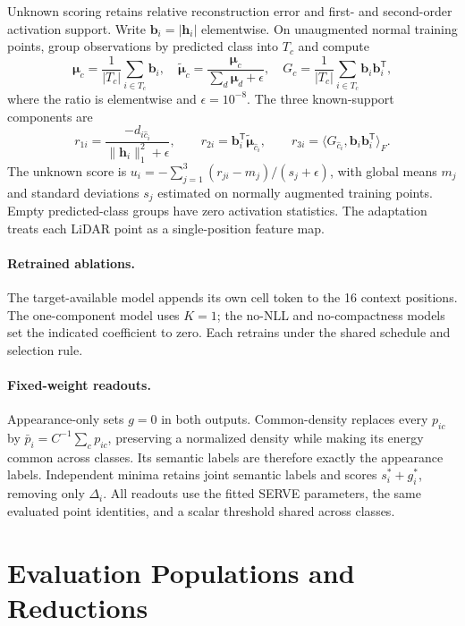 \documentclass{article}
\begin{document}
Unknown scoring retains relative reconstruction error and first- and second-order activation support. Write $\mathbf b_i=|\mathbf h_i|$ elementwise. On unaugmented normal training points, group observations by predicted class into $T_c$ and compute
\begin{equation}
 \boldsymbol\mu_c=\frac1{|T_c|}\sum_{i\in T_c}\mathbf b_i,\quad
 \widetilde{\boldsymbol\mu}_c=\frac{\boldsymbol\mu_c}{\sum_d\boldsymbol\mu_d+\epsilon},\quad
 G_c=\frac1{|T_c|}\sum_{i\in T_c}\mathbf b_i\mathbf b_i^{\mathsf T},
\end{equation}
where the ratio is elementwise and $\epsilon=10^{-8}$. The three known-support components are
\begin{equation}
 r_{1i}=\frac{-d_{i\hat c_i}}{\|\mathbf h_i\|_1^2+\epsilon},\qquad
 r_{2i}=\mathbf b_i^{\mathsf T}\widetilde{\boldsymbol\mu}_{\hat c_i},\qquad
 r_{3i}=\langle G_{\hat c_i},\mathbf b_i\mathbf b_i^{\mathsf T}\rangle_F.
\end{equation}
The unknown score is $u_i=-\sum_{j=1}^{3}(r_{ji}-m_j)/(s_j+\epsilon)$, with global means $m_j$ and standard deviations $s_j$ estimated on normally augmented training points. Empty predicted-class groups have zero activation statistics. The adaptation treats each LiDAR point as a single-position feature map.

\paragraph{Retrained ablations.}
The target-available model appends its own cell token to the 16 context positions. The one-component model uses $K=1$; the no-NLL and no-compactness models set the indicated coefficient to zero. Each retrains under the shared schedule and selection rule.

\paragraph{Fixed-weight readouts.}
Appearance-only sets $g=0$ in both outputs. Common-density replaces every $p_{ic}$ by $\bar p_i=C^{-1}\sum_cp_{ic}$, preserving a normalized density while making its energy common across classes. Its semantic labels are therefore exactly the appearance labels. Independent minima retains joint semantic labels and scores $s_i^*+g_i^*$, removing only $\Delta_i$. All readouts use the fitted SERVE parameters, the same evaluated point identities, and a scalar threshold shared across classes.

\section{Evaluation Populations and Reductions}
\label{app:evaluation}
\end{document}
